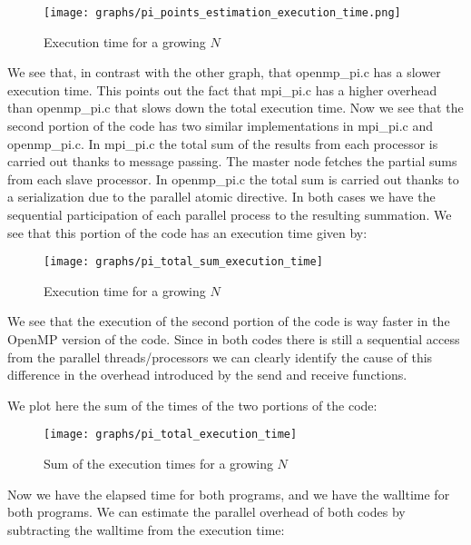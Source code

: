 \documentclass{article}
\begin{document}
\begin{figure}[H] %
	\centering
	\texttt{[image: graphs/pi\_points\_estimation\_execution\_time.png]} %
	\caption{Execution time for a growing $N$}
\end{figure}

We see that, in contrast with the other graph, that openmp\_pi.c has a slower execution time.
This points out the fact that mpi\_pi.c has a higher overhead than openmp\_pi.c that slows down the total execution time.
Now we see that the second portion of the code has two similar implementations in mpi\_pi.c and openmp\_pi.c.
In mpi\_pi.c the total sum of the results from each processor is carried out thanks to message passing. The master node fetches the partial sums from each slave processor.
 In openmp\_pi.c the total sum is carried out thanks to a serialization due to the parallel atomic directive.
In both cases we have the sequential participation of each parallel process to the resulting summation.
We see that this portion of the code has an execution time given by: 
\begin{figure}[H] %
	\centering
	\texttt{[image: graphs/pi\_total\_sum\_execution\_time]} %
	\caption{Execution time for a growing $N$}
\end{figure}

We see that the execution of the second portion of the code is way faster in the OpenMP version of the code. 
Since in both codes there is still a sequential access from the parallel threads/processors we can clearly identify the cause of this difference in the overhead introduced by the send and receive functions.

We plot here the sum of the times of the two portions of the code:
\begin{figure}[H] %
	\centering
	\texttt{[image: graphs/pi\_total\_execution\_time]} %
	\caption{Sum of the execution times for a growing $N$}
	\label{fig:execution_time_total_graph}
\end{figure}

Now we have the elapsed time for both programs, and we have the walltime for both programs.
We can estimate the parallel overhead of both codes by subtracting the walltime from the execution time:
\end{document}
